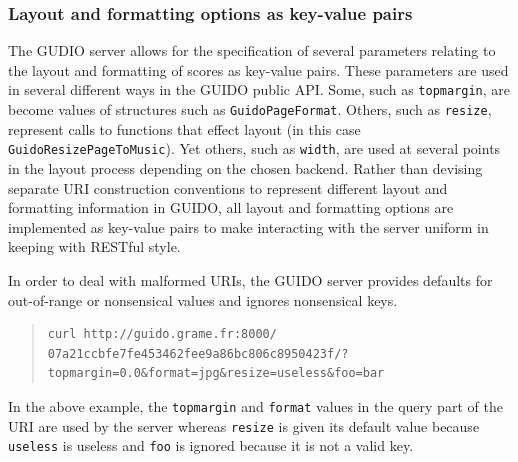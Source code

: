 \documentclass{article}
\newcommand{\guidosize}{6pt}
\begin{document}
\subsubsection{Layout and formatting options as key-value pairs}
The GUDIO server allows for the specification of several parameters relating to the layout and formatting of scores as key-value pairs.  These parameters are used in several different ways in the GUIDO public API.  Some, such as \verb=topmargin=, are become values of structures such as \verb=GuidoPageFormat=.  Others, such as \verb=resize=, represent calls to functions that effect layout (in this case \break \verb=GuidoResizePageToMusic=).  Yet others, such as \break \verb=width=, are used at several points in the layout process depending on the chosen backend.  Rather than devising separate URI construction conventions to represent different layout and formatting information in GUIDO, all layout and formatting options are implemented as key-value pairs to make interacting with the server uniform in keeping with RESTful style.\par
In order to deal with malformed URIs, the GUIDO server provides defaults for out-of-range or nonsensical values and ignores nonsensical keys.
\begin{quote}
\begingroup
\fontsize{\guidosize}{12pt}\selectfont
\begin{verbatim}
curl http://guido.grame.fr:8000/
07a21ccbfe7fe453462fee9a86bc806c8950423f/?
topmargin=0.0&format=jpg&resize=useless&foo=bar
\end{verbatim}
\endgroup
\end{quote}
In the above example, the \verb=topmargin= and \verb=format= values in the query part of the URI are used by the server whereas \verb=resize= is given its default value because \break \verb=useless= is  useless and \verb=foo= is ignored because it is not a valid key.%
\end{document}
